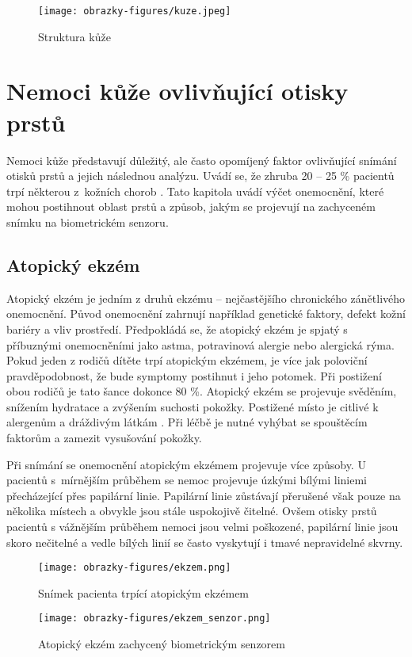 \begin{figure}[!htbp]
    \centering
    \texttt{[image: obrazky-figures/kuze.jpeg]}
    \caption{Struktura kůže \cite{DermatologickeFaktory}}
\end{figure}

\section{Nemoci kůže ovlivňující otisky prstů}
\label{sec:nemoci}
Nemoci kůže představují důležitý, ale často opomíjený faktor ovlivňující snímání otisků prstů a jejich následnou analýzu. Uvádí se, že zhruba 20 -- 25 \% pacientů trpí některou z~kožních chorob \cite{InfluenceSkinDiseases}. Tato kapitola uvádí výčet onemocnění, které mohou postihnout oblast prstů a způsob, jakým se projevují na zachyceném snímku na biometrickém senzoru. 
\subsection*{Atopický ekzém}
Atopický ekzém je jedním z druhů ekzému -- nejčastějšího chronického zánětlivého onemocnění. Původ onemocnění zahrnují například genetické faktory, defekt kožní bariéry a vliv prostředí. Předpokládá se, že atopický ekzém je spjatý s příbuznými onemocněními jako astma, potravinová alergie nebo alergická rýma. Pokud jeden z rodičů dítěte trpí atopickým ekzémem, je více jak poloviční pravděpodobnost, že bude symptomy postihnut i jeho potomek. Při postižení obou rodičů je tato šance dokonce 80 \%. Atopický ekzém se projevuje svěděním, snížením hydratace a zvýšením suchosti pokožky. Postižené místo je citlivé k alergenům a dráždivým látkám \cite{AtopicDermatitis}. Při léčbě je nutné vyhýbat se spouštěcím faktorům a zamezit vysušování pokožky.

Při snímání se onemocnění atopickým ekzémem projevuje více způsoby. U pacientů s~mírnějším průběhem se nemoc projevuje úzkými bílými liniemi přecházející přes papilární linie. Papilární linie zůstávají přerušené však pouze na několika místech a obvykle jsou stále uspokojivě čitelné. Ovšem otisky prstů pacientů s vážnějším průběhem nemoci jsou velmi poškozené, papilární linie jsou skoro nečitelné a vedle bílých linií se často vyskytují i tmavé nepravidelné skvrny.

\begin{figure}[!htbp]
  \begin{minipage}[b]{0.5\linewidth}
    \centering
    \texttt{[image: obrazky-figures/ekzem.png]}
    \caption{Snímek pacienta trpící atopickým ekzémem \cite{Barotova}}
  \end{minipage}
  \hspace{0.5cm}
  \begin{minipage}[b]{0.5\linewidth}
    \centering
    \texttt{[image: obrazky-figures/ekzem\_senzor.png]}
    \caption{Atopický ekzém zachycený biometrickým senzorem \cite{Barotova}}
  \end{minipage}
\end{figure}
